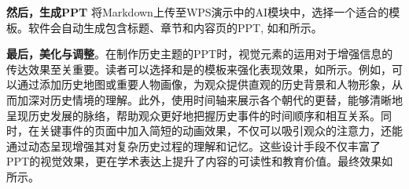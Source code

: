 \textbf{然后，生成PPT}
将Markdown上传至WPS演示中的AI模块中，选择一个适合的模板。软件会自动生成包含标题、章节和内容页的PPT, 如和所示。





\textbf{最后，美化与调整}。在制作历史主题的PPT时，视觉元素的运用对于增强信息的传达效果至关重要。读者可以选择和是的模板来强化表现效果，如所示。例如，可以通过添加历史地图或重要人物画像，为观众提供直观的历史背景和人物形象，从而加深对历史情境的理解。此外，使用时间轴来展示各个朝代的更替，能够清晰地呈现历史发展的脉络，帮助观众更好地把握历史事件的时间顺序和相互关系。同时，在关键事件的页面中加入简短的动画效果，不仅可以吸引观众的注意力，还能通过动态呈现增强其对复杂历史过程的理解和记忆。这些设计手段不仅丰富了PPT的视觉效果，更在学术表达上提升了内容的可读性和教育价值。最终效果如所示。

